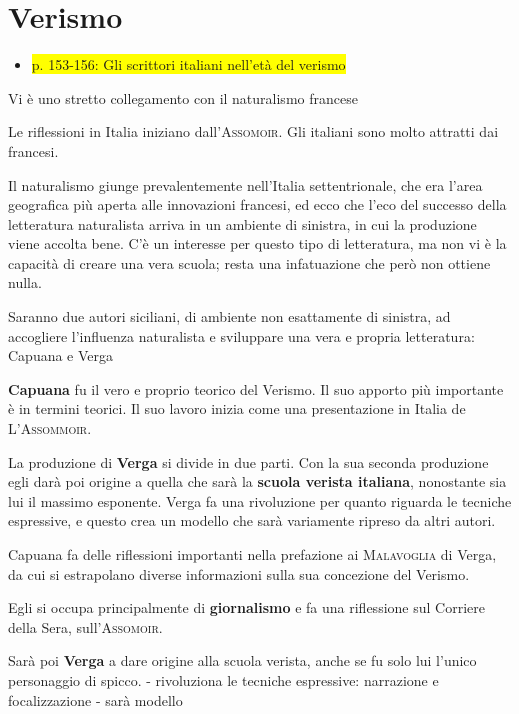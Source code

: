 \documentclass{book}
\newcommand{\pagine}[1]{\colorbox{yellow}{#1}}
\newcommand{\evidenziatore}[1]{\textbf{#1}}
\begin{document}
\chapter{Verismo}

\begin{itemize}
\item
  \pagine{p. 153-156: Gli scrittori italiani nell'età del verismo}
\end{itemize}

Vi è uno stretto collegamento con il naturalismo francese

Le riflessioni in Italia iniziano dall'\textsc{Assomoir}. Gli italiani
sono molto attratti dai francesi.

Il naturalismo giunge prevalentemente nell'Italia settentrionale, che
era l'area geografica più aperta alle innovazioni francesi, ed ecco che
l'eco del successo della letteratura naturalista arriva in un ambiente
di sinistra, in cui la produzione viene accolta bene. C'è un interesse
per questo tipo di letteratura, ma non vi è la capacità di creare una
vera scuola; resta una infatuazione che però non ottiene nulla.

Saranno due autori siciliani, di ambiente non esattamente di sinistra,
ad accogliere l'influenza naturalista e sviluppare una vera e propria
letteratura: Capuana e Verga

\evidenziatore{Capuana} fu il vero e proprio teorico del Verismo. Il suo
apporto più importante è in termini teorici. Il suo lavoro inizia come
una presentazione in Italia de \textsc{L'Assommoir}.

La produzione di \evidenziatore{Verga} si divide in due parti. Con la
sua seconda produzione egli darà poi origine a quella che sarà la
\textbf{scuola verista italiana}, nonostante sia lui il massimo
esponente. Verga fa una rivoluzione per quanto riguarda le tecniche
espressive, e questo crea un modello che sarà variamente ripreso da
altri autori.

Capuana fa delle riflessioni importanti nella prefazione ai
\textsc{Malavoglia} di Verga, da cui si estrapolano diverse informazioni
sulla sua concezione del Verismo.

Egli si occupa principalmente di \textbf{giornalismo} e fa una
riflessione sul Corriere della Sera, sull'\textsc{Assomoir}.

Sarà poi \evidenziatore{Verga} a dare origine alla scuola verista, anche
se fu solo lui l'unico personaggio di spicco. - rivoluziona le tecniche
espressive: narrazione e focalizzazione - sarà modello
\end{document}
